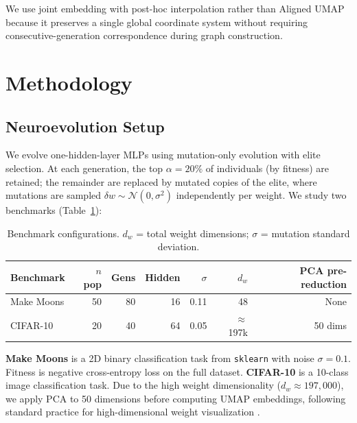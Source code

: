 \documentclass{article}
\begin{document}
We use joint embedding with post-hoc interpolation rather than Aligned
UMAP \cite{mcinnes2020aligned} because it preserves a single global
coordinate system without requiring consecutive-generation correspondence
during graph construction.


\section{Methodology}
\label{sec:methodology}

\subsection{Neuroevolution Setup}

We evolve one-hidden-layer MLPs using mutation-only evolution with
elite selection. At each generation, the top $\alpha = 20\%$ of
individuals (by fitness) are retained; the remainder are replaced by
mutated copies of the elite, where mutations are sampled
$\delta w \sim \mathcal{N}(0, \sigma^2)$ independently per weight.
We study two benchmarks (Table~\ref{tab:benchmarks}):

\begin{table}[!ht]
  \caption{Benchmark configurations. $d_w$ = total weight dimensions;
  $\sigma$ = mutation standard deviation.}
  \label{tab:benchmarks}
  \centering
  \begin{tabular}{lrrrrrr}
    \toprule
    Benchmark & $n$ pop & Gens & Hidden & $\sigma$ & $d_w$ & PCA pre-reduction \\
    \midrule
    Make Moons & 50 & 80 & 16 & 0.11 & 48 & None \\
    CIFAR-10   & 20 & 40 & 64 & 0.05 & $\approx$197k & 50 dims \\
    \bottomrule
  \end{tabular}
\end{table}

\textbf{Make Moons} is a 2D binary classification task from
\texttt{sklearn} \cite{pedregosa2011scikit} with noise $\sigma = 0.1$.
Fitness is negative cross-entropy loss on the full dataset.
\textbf{CIFAR-10} \cite{krizhevsky2009learning} is a 10-class image
classification task. Due to the high weight dimensionality ($d_w \approx
197{,}000$), we apply PCA to 50 dimensions before computing UMAP
embeddings, following standard practice for high-dimensional weight
visualization \cite{li2018visualizing}.
\end{document}
